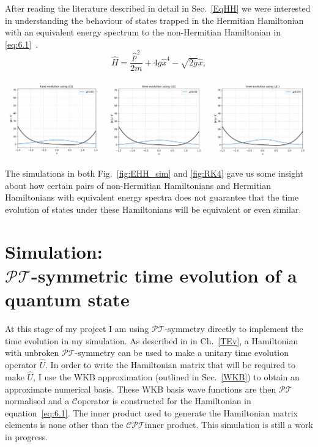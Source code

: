 \documentclass[12pt, a4paper]{report}
\newenvironment{Figure}
    {\par\medskip\noindent\minipage{\linewidth}}
    {\endminipage\par\medskip}
\newcommand\PT{\(\mathcal{PT}\)}
\newcommand\CC{\(\mathcal{C}\)}
\begin{document}
After reading the literature described in detail in Sec.~\ref{EqHH} we were interested in understanding the behaviour of states trapped in the Hermitian Hamiltonian with an equivalent energy spectrum to the non-Hermitian Hamiltonian in \ref{eq:6.1}~\cite{HHEquivalent, Equivalent_withanomaly, ParityAnomaly}. 
\begin{equation}\label{eq:6.3}
\hat{H} = \frac{\hat{p}^2}{2m} + 4g\hat{x}^4 - \sqrt{2g}\hat{x},
\end{equation}
\begin{Figure}
\centering
\includegraphics[width=\linewidth]{EHH_sim.pdf}
\label{fig:EHH_sim}
\end{Figure}
The simulations in both Fig.~\ref{fig:EHH_sim} and \ref{fig:RK4} gave us some insight about how certain pairs of non-Hermitian Hamiltonians and Hermitian Hamiltonians with equivalent energy spectra does not guarantee that the time evolution of states under these Hamiltonians will be equivalent or even similar.

\section{Simulation:\\ \PT-symmetric time evolution of a quantum state}
At this stage of my project I am using \PT-symmetry directly to implement the time evolution in my simulation. As described in in Ch.~\ref{TEv}, a Hamiltonian with unbroken \PT-symmetry can be used to make a unitary time evolution operator $\hat{U}$. In order to write the Hamiltonian matrix that will be required to make $\hat{U}$, I use the WKB approximation (outlined in Sec.~\ref{WKB}) to obtain an approximate numerical basis. These WKB basis wave functions are then \PT\:normalised and a \CC\:operator is constructed for the Hamiltonian in equation~\ref{eq:6.1}. The inner product used to generate the Hamiltonian matrix elements is none other than the \CC\PT\:inner product. This simulation is still a work in progress. 
\end{document}
